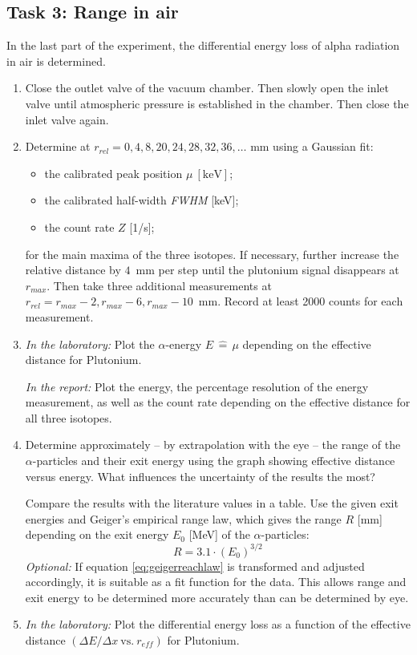 \subsection{Task 3: Range in air}
In the last part of the experiment, the differential energy loss of alpha radiation in air is determined.

\begin{enumerate}[label=\textbf{\alph*)}]
	\item Close the outlet valve of the vacuum chamber. Then slowly open the inlet valve until atmospheric pressure is established in the chamber. Then close the inlet valve again.
	\item Determine at $r_{rel} = 0, 4, 8, 20, 24, 28, 32, 36, \dots$ mm using a Gaussian fit:
	\begin{itemize}[nosep]
		\item the calibrated peak position $\mu\ [\text{keV}]$;
		\item the calibrated half-width \textit{FWHM} [keV];
		\item the count rate $Z$ [1/s];
	\end{itemize}
	for the main maxima of the three isotopes. If necessary, further increase the relative distance by $4$~mm per step until the plutonium signal disappears at $r_{max}$. Then take three additional measurements at $r_{rel} = r_{max} - 2, r_{max} - 6, r_{max} - 10$~mm. Record at least 2000 counts for each measurement.
	\item \textit{In the laboratory:} Plot the $\alpha$-energy $E\, \widehat{=}\, \mu$ depending on the effective distance for Plutonium. 
	
	\textit{In the report:} Plot the energy, the percentage resolution of the energy measurement, as well as the count rate depending on the effective distance for all three isotopes.
	\item Determine approximately -- by extrapolation with the eye -- the range of the $\alpha$-particles and their exit energy using the graph showing effective distance versus energy. What influences the uncertainty of the results the most?
	
	Compare the results with the literature values in a table. Use the given exit energies and Geiger's empirical range law, which gives the range $R$ [mm] depending on the exit energy $E_0$ [MeV] of the $\alpha$-particles:
	\begin{equation}\label{eq:geigerreachlaw}
		R = 3.1 \cdot \left(E_0\right)^{3/2}
	\end{equation}
	\textit{Optional:} If equation \ref{eq:geigerreachlaw} is transformed and adjusted accordingly, it is suitable as a fit function for the data. This allows range and exit energy to be determined more accurately than can be determined by eye.
	\item \textit{In the laboratory:} Plot the differential energy loss as a function of the effective distance $\left( \Delta E/ \Delta x \ \text{vs.}\ r_{eff} \right)$ for Plutonium.
	

\end{enumerate}
